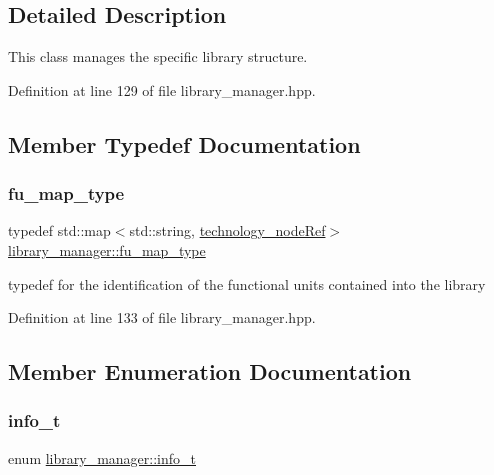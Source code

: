 \subsection{Detailed Description}
This class manages the specific library structure. 

Definition at line 129 of file library\+\_\+manager.\+hpp.



\subsection{Member Typedef Documentation}
\mbox{\label{classlibrary__manager_a17941addb97906d7b41c5b0b0317fde2}} 
\subsubsection{\texorpdfstring{fu\+\_\+map\+\_\+type}{fu\_map\_type}}
{\footnotesize\ttfamily typedef std\+::map$<$std\+::string, \hyperlink{technology__node_8hpp_a33dd193b7bd6b987bf0d8a770a819fa7}{technology\+\_\+node\+Ref}$>$ \hyperlink{classlibrary__manager_a17941addb97906d7b41c5b0b0317fde2}{library\+\_\+manager\+::fu\+\_\+map\+\_\+type}}



typedef for the identification of the functional units contained into the library 



Definition at line 133 of file library\+\_\+manager.\+hpp.



\subsection{Member Enumeration Documentation}
\mbox{\label{classlibrary__manager_a5914a62c60d05c22f2547de9d8ef20de}} 
\subsubsection{\texorpdfstring{info\+\_\+t}{info\_t}}
{\footnotesize\ttfamily enum \hyperlink{classlibrary__manager_a5914a62c60d05c22f2547de9d8ef20de}{library\+\_\+manager\+::info\+\_\+t}}



